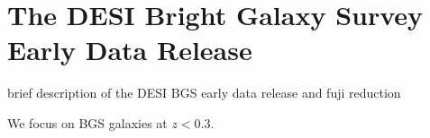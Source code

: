 \section{The DESI Bright Galaxy Survey Early Data Release}  \label{sec:edr}


brief description of the DESI BGS early data release and fuji reduction 


We focus on BGS galaxies at $z < 0.3$. 
